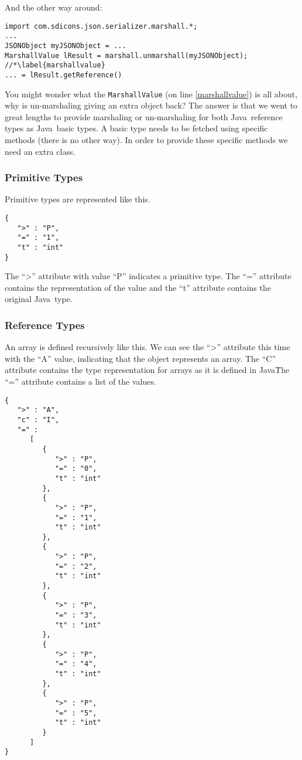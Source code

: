 \documentclass[a4paper]{article}
\newcommand{\java}{Java}
\begin{document}
And the other way around:
 
\medskip
\begin{lstlisting}
import com.sdicons.json.serializer.marshall.*;
...
JSONObject myJSONObject = ...
MarshallValue lResult = marshall.unmarshall(myJSONObject); //*\label{marshallvalue}
... = lResult.getReference()
\end{lstlisting}
\medskip

You might wonder what the \lstinline{MarshallValue} (on line \ref{marshallvalue}) is all about, why is un-marshaling giving an extra object back? The answer is that we went to great lengths to provide marshaling or un-marshaling for both \java\ reference types as \java\ basic types. A basic type needs to be fetched using specific methods (there is no other way). In order to provide these specific methods we need an extra class.

\subsubsection{Primitive Types}

Primitive types are represented like this.

\medskip
\begin{lstlisting}
{
   ">" : "P",
   "=" : "1",
   "t" : "int"
}
\end{lstlisting}
\medskip

The ``>''  attribute with value ``P''  indicates a primitive type. The ``=''  attribute contains the representation of the value and the ``t'' attribute contains the original \java\ type.

\subsubsection{Reference Types}

An array is defined recursively like this. We can see the ``>'' attribute this time with the ``A''  value, indicating that the object represents an array. The ``C'' attribute contains the type representation for arrays as it is defined in \java\. The ``=''  attribute contains a list of the values.

\medskip
\begin{lstlisting}
{
   ">" : "A",
   "c" : "I",
   "=" :
      [
         {
            ">" : "P",
            "=" : "0",
            "t" : "int"
         },
         {
            ">" : "P",
            "=" : "1",
            "t" : "int"
         },
         {
            ">" : "P",
            "=" : "2",
            "t" : "int"
         },
         {
            ">" : "P",
            "=" : "3",
            "t" : "int"
         },
         {
            ">" : "P",
            "=" : "4",
            "t" : "int"
         },
         {
            ">" : "P",
            "=" : "5",
            "t" : "int"
         }
      ]
}
\end{lstlisting}
\medskip
\end{document}
